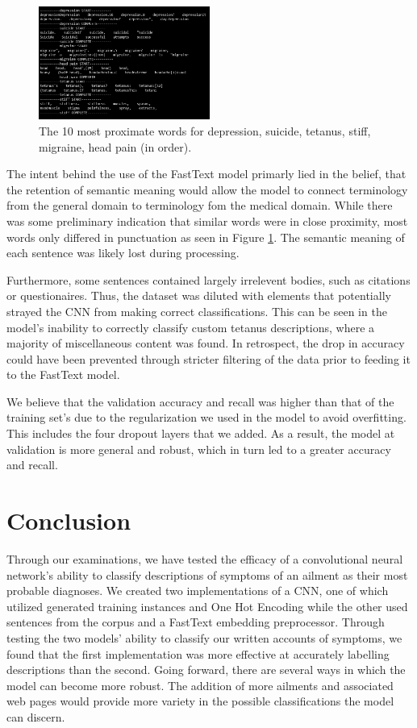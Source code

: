 \documentclass[12pt]{report}
\begin{document}
\begin{figure}[H]
	\centering
	\includegraphics[width=0.5\textwidth]{proximate-words.png}
	\caption{The 10 most proximate words for depression, suicide, tetanus, stiff, migraine, head pain (in order).}
	\label{fig:prox-words}
\end{figure}

The intent behind the use of the FastText model primarly lied in
the belief, that the retention of semantic meaning would allow the
model to connect terminology from the general domain to
terminology fom the medical domain\cite{rehurek2011gensim}. While there was some preliminary
indication that similar words were in close proximity, most words
only differed in punctuation as seen in Figure \ref{fig:prox-words}.
The semantic meaning of each sentence was likely lost during processing.

Furthermore, some sentences contained largely irrelevent bodies, such as
citations or questionaires. Thus, the dataset was diluted with elements that
potentially strayed the CNN from making correct classifications. This can be
seen in the model's inability to correctly classify custom tetanus descriptions,
where a majority of miscellaneous content was found. In retrospect, the drop
in accuracy could have been prevented through stricter filtering of the data
prior to feeding it to the FastText model.

We believe that the validation accuracy and recall was higher than that of the training set's
due to the regularization we used in the model to avoid overfitting.
This includes the four dropout layers that we added. As a result, the model
at validation is more general and robust, which in turn led to a greater
accuracy and recall.

\chapter{Conclusion}

Through our examinations, we have tested the efficacy of a convolutional neural
network's ability to classify descriptions of symptoms of an ailment as their
most probable diagnoses. We created two implementations of a CNN,
one of which utilized generated training instances and One Hot Encoding while
the other used sentences from the corpus and a FastText embedding preprocessor\cite{rehurek2011gensim}.
Through testing
the two models' ability to classify our written accounts of symptoms, we found
that the first implementation was more effective at accurately labelling
descriptions than the second. Going forward, there are several ways in which the
model can become more robust. The addition of more ailments and associated web
pages would provide more variety in the possible classifications the model can
discern.


\end{document}
